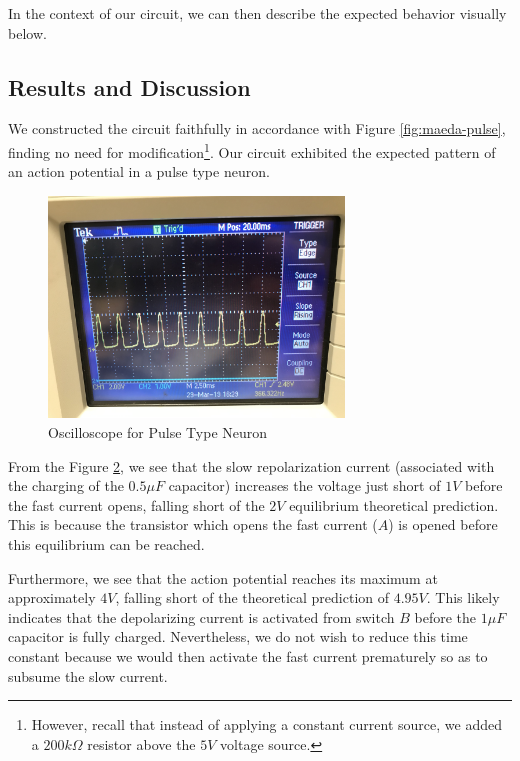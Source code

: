 \documentclass[12]{book}
\newcommand\0{\mathbf{0}}
\newcommand\<{\langle}
\renewcommand\>{\rangle}
\begin{document}
In the context of our circuit, we can then describe the expected behavior visually below.

\begin{figure}	
\label{fig:action-explained}
\end{figure}
 

\subsection{Results and Discussion}

We constructed the circuit faithfully in accordance with Figure \ref{fig:maeda-pulse}, finding no need for modification\footnote{However, recall that instead of applying a constant current source, we added a $200k\Omega$ resistor above the $5V$ voltage source.}. Our circuit exhibited the expected pattern of an action potential in  a pulse type neuron.

\begin{figure}[h]
\centering
\includegraphics[width=0.7\textwidth]{neuron.jpeg}	
\caption{Oscilloscope for Pulse Type Neuron}
\label{fig:pulse}
\end{figure}

From the Figure \ref{fig:pulse}, we see that the slow repolarization current (associated with the charging of the $0.5 \mu F$ capacitor) increases the voltage just short of $1 V$ before the fast current opens, falling short of the $2V$ equilibrium theoretical prediction. This is because the transistor which opens the fast current ($A$) is opened before this equilibrium can be reached.

Furthermore, we see that the action potential reaches its maximum at approximately $4 V$, falling short of the theoretical prediction of $4.95V$. This likely indicates that the depolarizing current is activated from switch $B$ before the $1 \mu F$ capacitor is fully charged. Nevertheless, we do not wish to reduce this time constant because we would then activate the fast current prematurely so as to subsume the slow current.
\end{document}
